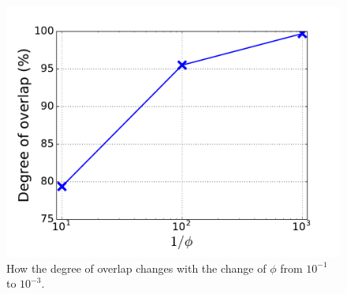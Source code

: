 \begin{figure}[!htb]
  \includegraphics[width=\linewidth]{figure/overlap.pdf}
  {
  How the degree of overlap changes with the change of $\phi$ from $10^{-1}$ to $10^{-3}$.
  }
\endminipage\hfill

\vspace{-0.1in}
\end{figure}